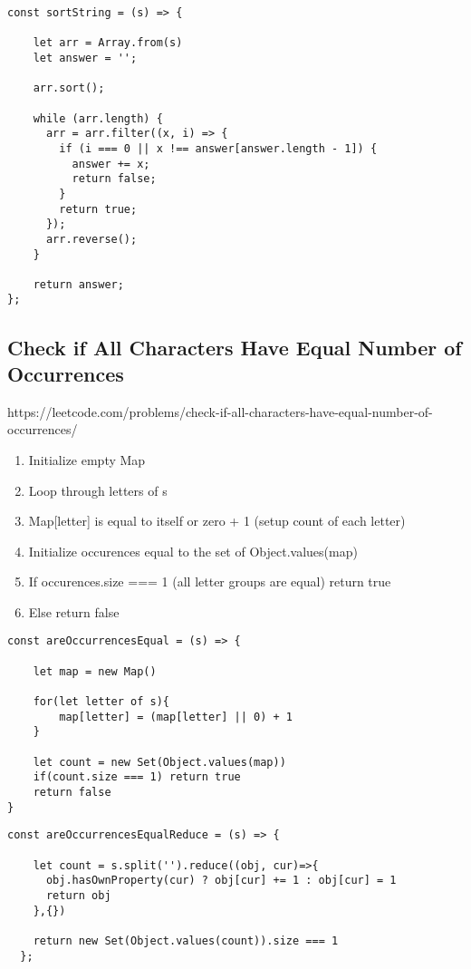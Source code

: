 \documentclass[10pt]{article}
\begin{document}
\begin{lstlisting}[title=Solution sortString, captionpos=t]
const sortString = (s) => {
    
    let arr = Array.from(s)
    let answer = '';
    
    arr.sort();
  
    while (arr.length) {
      arr = arr.filter((x, i) => {
        if (i === 0 || x !== answer[answer.length - 1]) {
          answer += x;
          return false;
        }
        return true;
      });
      arr.reverse();
    }
  
    return answer;
};
\end{lstlisting}
\medskip %







\pagebreak %
\medskip   
\subsection{Check if All Characters Have Equal Number of Occurrences}
https://leetcode.com/problems/check-if-all-characters-have-equal-number-of-occurrences/

\begin{enumerate}
	\item Initialize empty Map
	\item Loop through letters of s
	\item Map[letter] is equal to itself or zero + 1 (setup count of each letter)
	\item Initialize occurences equal to the set of Object.values(map)
	\item If occurences.size === 1 (all letter groups are equal) return true
	\item Else return false
\end{enumerate}

\begin{lstlisting}[title=Solution areOccurrencesEqual with Map, captionpos=t]
const areOccurrencesEqual = (s) => {
    
    let map = new Map()
    
    for(let letter of s){
        map[letter] = (map[letter] || 0) + 1
    }
    
    let count = new Set(Object.values(map))
    if(count.size === 1) return true
    return false 
}
\end{lstlisting}

\begin{lstlisting}[title=Solution areOccurrencesEqual with reduce(), captionpos=t]
const areOccurrencesEqualReduce = (s) => {
    
    let count = s.split('').reduce((obj, cur)=>{
      obj.hasOwnProperty(cur) ? obj[cur] += 1 : obj[cur] = 1
      return obj
    },{})

    return new Set(Object.values(count)).size === 1
  };
\end{lstlisting}
\medskip %
\end{document}
